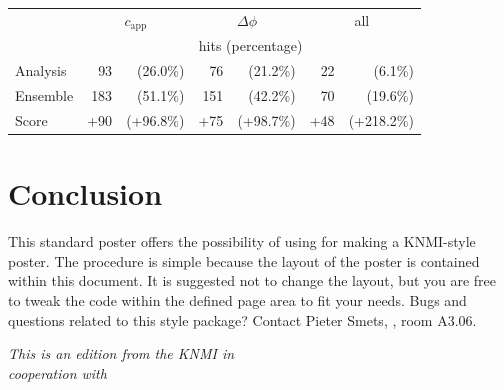 \documentclass{article}
\begin{document}
\vspace{20pt plus 10pt minus 5pt}
\begin{minipage}[b]{\columnwidth}
%
\begin{center}
\begin{tabular}{l r r | r r | r r}
\hline
& \multicolumn{2}{c}{$c_{\text{app}}$} &  \multicolumn{2}{|c}{$\Delta\phi$} &  \multicolumn{2}{|c}{all} \\
\cline{2-7}
& \multicolumn{6}{c}{hits (percentage)} \\
\hline
Analysis 	& 93	&(26.0\%) & 76 & (21.2\%) &  22 & (6.1\%) \\
Ensemble & 183 &(51.1\%) & 151 & (42.2\%)  & 70 & (19.6\%) \\
Score & +90 & (+96.8\%) & +75 & (+98.7\%)  & +48 & (+218.2\%) \\
\hline
\end{tabular}
\end{center}
\label{table}
%
\end{minipage}



\section*{Conclusion}
This standard poster offers the possibility of using \latex for making a KNMI-style poster. The procedure is simple because the layout of the poster is contained within this document. It is suggested not to change the layout, but you are free to tweak the \latex code within the defined page area to fit your needs. Bugs and questions related to this \latex style package? Contact Pieter Smets, , room A3.06.

\pushdown

\begin{fminipage}{\columnwidth}
\textit{%
\noindent This is an edition from the KNMI in \\
cooperation with
} %
\end{fminipage}

\ecols %
\end{document}
